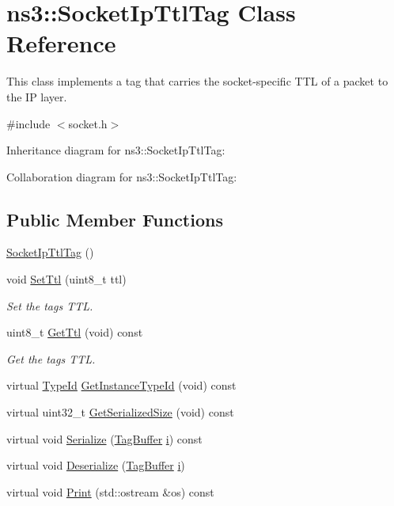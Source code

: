 \hypertarget{classns3_1_1SocketIpTtlTag}{}\section{ns3\+:\+:Socket\+Ip\+Ttl\+Tag Class Reference}
\label{classns3_1_1SocketIpTtlTag}


This class implements a tag that carries the socket-\/specific T\+TL of a packet to the IP layer.  




{\ttfamily \#include $<$socket.\+h$>$}



Inheritance diagram for ns3\+:\+:Socket\+Ip\+Ttl\+Tag\+:


Collaboration diagram for ns3\+:\+:Socket\+Ip\+Ttl\+Tag\+:
\subsection*{Public Member Functions}
\begin{DoxyCompactItemize}
\item 
\hyperlink{classns3_1_1SocketIpTtlTag_a5a5616987b2ca8ac9516329d52f342d1}{Socket\+Ip\+Ttl\+Tag} ()
\item 
void \hyperlink{classns3_1_1SocketIpTtlTag_a48f236b4dde3533b9ab16372cf6c5237}{Set\+Ttl} (uint8\+\_\+t ttl)
\begin{DoxyCompactList}\small\item\em Set the tag\textquotesingle{}s T\+TL. \end{DoxyCompactList}\item 
uint8\+\_\+t \hyperlink{classns3_1_1SocketIpTtlTag_a7e64d4ab905aef4d7f60cb3cf4ccf489}{Get\+Ttl} (void) const 
\begin{DoxyCompactList}\small\item\em Get the tag\textquotesingle{}s T\+TL. \end{DoxyCompactList}\item 
virtual \hyperlink{classns3_1_1TypeId}{Type\+Id} \hyperlink{classns3_1_1SocketIpTtlTag_a95a323aeb02d1af9a3bf04b4737879b8}{Get\+Instance\+Type\+Id} (void) const 
\item 
virtual uint32\+\_\+t \hyperlink{classns3_1_1SocketIpTtlTag_acd96e4aab7f98751f5b1fbe0d3868e35}{Get\+Serialized\+Size} (void) const 
\item 
virtual void \hyperlink{classns3_1_1SocketIpTtlTag_a983a1f7a94229f97f090b0579656628b}{Serialize} (\hyperlink{classns3_1_1TagBuffer}{Tag\+Buffer} \hyperlink{lte__uplink__power__control_8m_a6f6ccfcf58b31cb6412107d9d5281426}{i}) const 
\item 
virtual void \hyperlink{classns3_1_1SocketIpTtlTag_a2d9053953f61f7856f1c7372bcfd025d}{Deserialize} (\hyperlink{classns3_1_1TagBuffer}{Tag\+Buffer} \hyperlink{lte__uplink__power__control_8m_a6f6ccfcf58b31cb6412107d9d5281426}{i})
\item 
virtual void \hyperlink{classns3_1_1SocketIpTtlTag_a54c76bfa703d25b3618ff1e31298be0a}{Print} (std\+::ostream \&os) const 
\end{DoxyCompactItemize}

